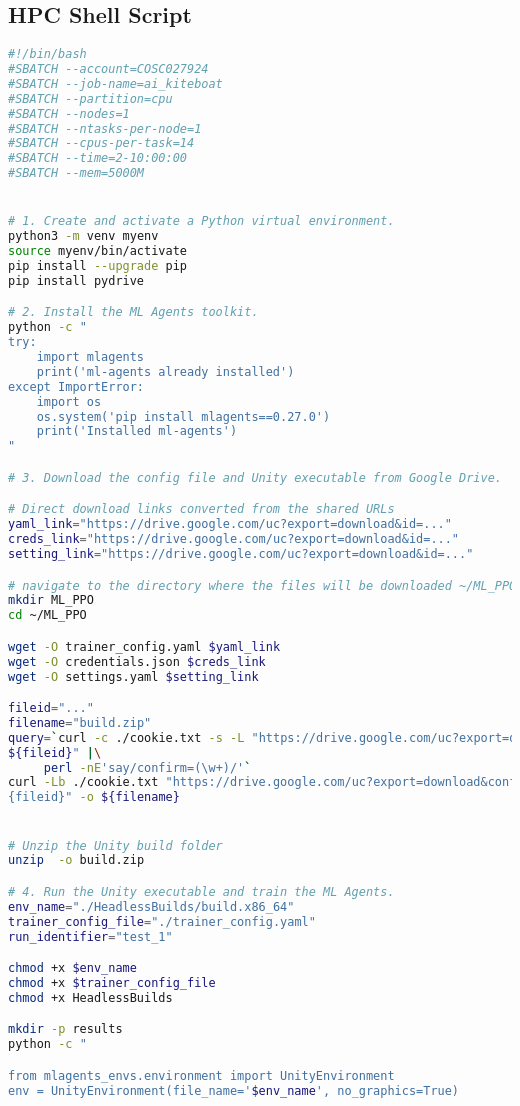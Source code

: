   \subsection{HPC Shell Script}\label{sec:shell_script}
  \begin{lstlisting}[language=bash]
    #!/bin/bash
#SBATCH --account=COSC027924
#SBATCH --job-name=ai_kiteboat
#SBATCH --partition=cpu
#SBATCH --nodes=1
#SBATCH --ntasks-per-node=1
#SBATCH --cpus-per-task=14
#SBATCH --time=2-10:00:00
#SBATCH --mem=5000M


# 1. Create and activate a Python virtual environment.
python3 -m venv myenv
source myenv/bin/activate
pip install --upgrade pip
pip install pydrive

# 2. Install the ML Agents toolkit.
python -c "
try:
    import mlagents
    print('ml-agents already installed')
except ImportError:
    import os
    os.system('pip install mlagents==0.27.0')
    print('Installed ml-agents')
"

# 3. Download the config file and Unity executable from Google Drive.

# Direct download links converted from the shared URLs
yaml_link="https://drive.google.com/uc?export=download&id=..."
creds_link="https://drive.google.com/uc?export=download&id=..."
setting_link="https://drive.google.com/uc?export=download&id=..."

# navigate to the directory where the files will be downloaded ~/ML_PPO
mkdir ML_PPO
cd ~/ML_PPO

wget -O trainer_config.yaml $yaml_link
wget -O credentials.json $creds_link
wget -O settings.yaml $setting_link

fileid="..."
filename="build.zip"
query=`curl -c ./cookie.txt -s -L "https://drive.google.com/uc?export=download&id=
${fileid}" |\
     perl -nE'say/confirm=(\w+)/'`
curl -Lb ./cookie.txt "https://drive.google.com/uc?export=download&confirm=${query}&id=
{fileid}" -o ${filename}


# Unzip the Unity build folder
unzip  -o build.zip 

# 4. Run the Unity executable and train the ML Agents.
env_name="./HeadlessBuilds/build.x86_64"
trainer_config_file="./trainer_config.yaml"
run_identifier="test_1"

chmod +x $env_name 
chmod +x $trainer_config_file
chmod +x HeadlessBuilds

mkdir -p results
python -c "

from mlagents_envs.environment import UnityEnvironment
env = UnityEnvironment(file_name='$env_name', no_graphics=True)


\end{lstlisting}
